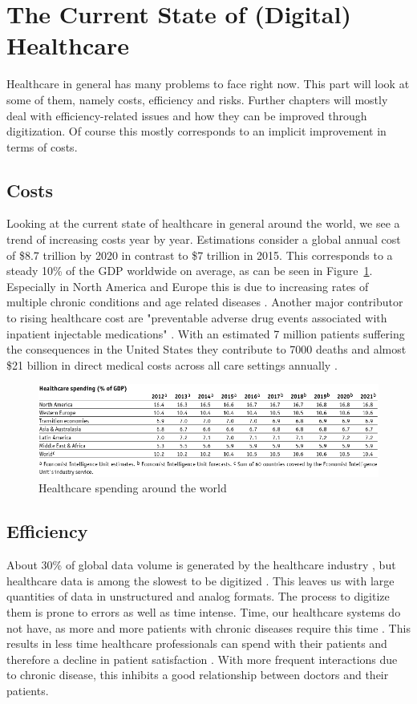 \section{The Current State of (Digital) Healthcare}
Healthcare in general has many problems to face right now. This part will look at some of them, namely costs, efficiency and risks. Further chapters will mostly deal with efficiency-related issues and how they can be improved through digitization. Of course this mostly corresponds to an implicit improvement in terms of costs.
\subsection{Costs}
Looking at the current state of healthcare in general around the world, we see a trend of increasing costs year by year. Estimations consider a global annual cost of \$8.7 trillion by 2020 in contrast to \$7 trillion in 2015. This corresponds to a steady 10\% of the GDP worldwide on average, as can be seen in Figure~\ref{fig:GDPSpendingHC}.
Especially in North America and Europe this is due to increasing rates of multiple chronic conditions and age related diseases \cite{sambamoorthi2015multiple}. Another major contributor to rising healthcare cost are "preventable adverse drug events associated with inpatient injectable medications" \cite{lahue2012national}. With an estimated 7 million patients suffering the consequences in the United States they contribute to 7000 deaths and almost \$21 billion in direct medical costs across all care settings annually \cite{prevMedErrors}.
\begin{figure}[htpb]
    \centering
    \includegraphics[width=\linewidth]{media/Screenshot_2020-01-09_01_FULL_REPORT-World_healthcare_and.png}
    \caption{Healthcare spending around the world \cite{EIU2016}}%
    \label{fig:GDPSpendingHC}
\end{figure}
\subsection{Efficiency}
About 30\% of global data volume is generated by the healthcare industry \cite{gopal2019digital}, but healthcare data is among the slowest to be digitized \cite{industryDigitalization}. This leaves us with large quantities of data in unstructured and analog formats. The process to digitize them is prone to errors as well as time intense. Time, our healthcare systems do not have, as more and more patients with chronic diseases require this time \cite{ostbye2005there}. This results in less time healthcare professionals can spend with their patients \cite{fuchtbauer2013emergency} and therefore a decline in patient satisfaction \cite{gross1998patient}. With more frequent interactions due to chronic disease, this inhibits a good relationship between doctors and their patients.
